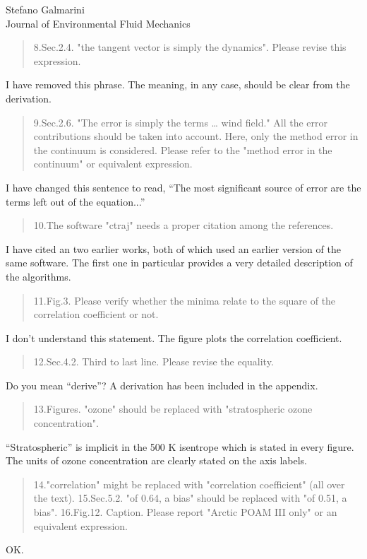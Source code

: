 \documentclass{letter}
\begin{document}
\begin{letter}{Stefano Galmarini\\
Journal of Environmental Fluid Mechanics}
\begin{quote}
8.Sec.2.4. "the tangent vector is simply the dynamics". Please revise this expression.
\end{quote}
I have removed this phrase. The meaning, in any case, should be clear from the derivation.
\begin{quote}
9.Sec.2.6. "The error is simply the terms … wind field." All the error contributions should be taken into account. Here, only the method error in the continuum is considered. Please refer to the "method error in the continuum" or equivalent expression.
\end{quote}
I have changed this sentence to read, ``The most significant source of error are the terms left out of the equation...''
\begin{quote}
10.The software "ctraj" needs a proper citation among the references.
\end{quote}
I have cited an two earlier works, both of which used an earlier version of the same software. The first one in particular provides a very detailed description of the algorithms.
\begin{quote}
11.Fig.3. Please verify whether the minima relate to the square of the correlation coefficient or not.
\end{quote}
I don't understand this statement. The figure plots the correlation coefficient.
\begin{quote}
12.Sec.4.2. Third to last line. Please revise the equality.
\end{quote}
Do you mean ``derive''? A derivation has been included in the appendix.
\begin{quote}
13.Figures. "ozone" should be replaced with "stratospheric ozone concentration".
\end{quote}
``Stratospheric'' is implicit in the 500 K isentrope which is stated in 
every figure. The units of ozone concentration are clearly stated on the axis labels.
\begin{quote}
14."correlation" might be replaced with "correlation coefficient" (all over the text).
15.Sec.5.2. "of 0.64, a bias" should be replaced with "of 0.51, a bias".
16.Fig.12. Caption. Please report "Arctic POAM III only" or an equivalent expression.
\end{quote}
OK.


\end{letter}
\end{document}
